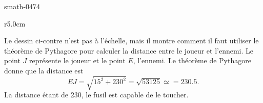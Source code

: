 
\begin{corrige}{smath-0474}

    \begin{wrapfigure}[4]{r}{5.0cm}
   \vspace{-0.5cm}        %
   \centering
   
\end{wrapfigure}

Le dessin ci-contre n'est pas à l'échelle, mais il montre comment il faut utiliser le théorème de Pythagore pour calculer la distance entre le joueur et l'ennemi. Le point \( J\) représente le joueur et le point \( E\), l'ennemi. Le théorème de Pythagore donne que la distance est
\begin{equation}
    EJ=\sqrt{15^2+230^2}=\sqrt{53125}\simeq=230.5.
\end{equation}
La distance étant de \unit{230}{\meter}, le fusil est capable de le toucher.

\end{corrige}
